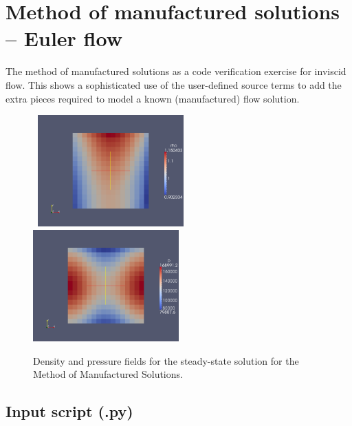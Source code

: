 
\section{Method of manufactured solutions -- Euler flow}
\label{mms-euler-sec}
%
The method of manufactured solutions as a code verification exercise for inviscid flow.
This shows a sophisticated use of the user-defined source terms to
add the extra pieces required to model a known (manufactured) flow solution.

\begin{figure}[htbp]
\begin{center}
\mbox{
\includegraphics[width=0.5\textwidth]{../2D/mms_euler/mms-density.png}
\includegraphics[width=0.5\textwidth]{../2D/mms_euler/mms-pressure.png}
}
\end{center}
\caption{Density and pressure fields for the steady-state solution for the
  Method of Manufactured Solutions.}
\label{mms-euler-density-pressure-fig}
\end{figure}


\newpage

\subsection{Input script (.py)}
\topbar

\bottombar

